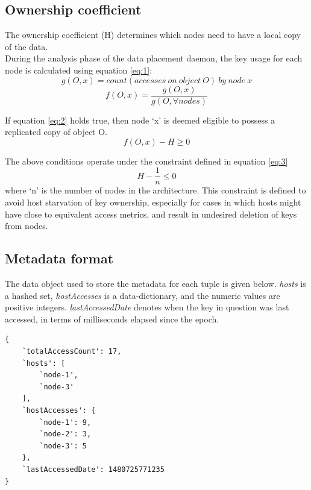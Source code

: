 \documentclass{sig-alternate}
\begin{document}
\subsection{Ownership coefficient}
The ownership coefficient (H) determines which nodes need to have a local copy of the data.\\

During the analysis phase of the data placement daemon, the key usage for each node is calculated using equation \ref{eq:1}:
\begin{equation*}g(O, x) = count(accesses\ on\ object\ O)\ by\ node\ x \end{equation*}
\begin{equation} \label{eq:1} f(O,x) = \frac{g(O, x)}{g(O, \forall nodes)} \end{equation}

If equation \ref{eq:2} holds true, then node `x' is deemed eligible to possess a replicated copy of object O.
\begin{equation} \label{eq:2} f(O, x) - H \geq 0 \end{equation}

The above conditions operate under the constraint defined in equation \ref{eq:3}
\begin{equation} \label{eq:3} H - \frac{1}{n} \leq 0 \end{equation}
where `n' is the number of nodes in the architecture. This constraint is defined to avoid host starvation of key ownership, especially for cases in which hosts might have close to equivalent access metrics, and result in undesired deletion of keys from nodes.\\


\subsection{Metadata format}
The data object used to store the metadata for each tuple is given below. \textit{hosts} is a hashed set, \textit{hostAccesses} is a data-dictionary, and the numeric values are positive integers. \textit{lastAccessedDate} denotes when the key in question was last accessed, in terms of milliseconds elapsed since the epoch.\\
\begin{lstlisting}
{
    `totalAccessCount': 17,
    `hosts': [
        `node-1',
        `node-3'
    ],
    `hostAccesses': {
        `node-1': 9,
        `node-2': 3,
        `node-3': 5
    },
    `lastAccessedDate': 1480725771235
}
\end{lstlisting}
\end{document}
